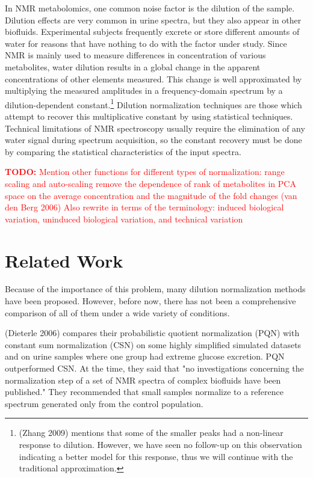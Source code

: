 \documentclass[english]{article}
\newcommand{\todo}[1]{\textcolor{red}{\textbf{TODO:} #1}}
\begin{document}
In NMR metabolomics, one common noise factor is the dilution of the sample. Dilution effects are very common in urine spectra, but they also appear in other biofluids. Experimental subjects frequently excrete or store different amounts of water for reasons that have nothing to do with the factor under study. Since NMR is mainly used to measure differences in concentration of various metabolites, water dilution results in a global change in the apparent concentrations of other elements measured. This change is well approximated by multiplying the measured amplitudes in a frequency-domain spectrum by a dilution-dependent constant.\footnote{(Zhang 2009) mentions that some of the smaller peaks had a non-linear response to dilution. However, we have seen no follow-up on this observation indicating a better model for this response, thus we will continue with the traditional approximation.} Dilution normalization techniques are those which attempt to recover this multiplicative constant by using statistical techniques. Technical limitations of NMR spectroscopy usually require the elimination of any water signal during spectrum acquisition, so the constant recovery must be done by comparing the statistical characteristics of the input spectra.

\todo{Mention other functions for different types of normalization: range scaling and auto-scaling remove the dependence of rank of metabolites in PCA space on the average concentration and the magnitude of the fold changes (van den Berg 2006) Also rewrite in terms of the terminology: induced biological variation, uninduced biological variation, and technical variation}

\section{Related Work}
Because of the importance of this problem, many dilution normalization methods have been proposed. However, before now, there has not been a comprehensive comparison of all of them under a wide variety of conditions.

(Dieterle 2006) compares their probabilistic quotient normalization (PQN) with constant sum normalization (CSN) on some highly simplified simulated datasets and on urine samples where one group had extreme glucose excretion. PQN outperformed CSN. At the time, they said that "no investigations concerning the normalization step of a set of NMR spectra of complex biofluids have been published." They recommended that small samples normalize to a reference spectrum generated only from the control population.
\end{document}
